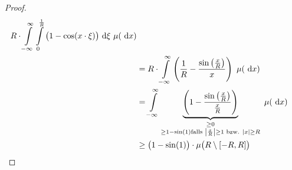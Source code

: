 \begin{proof}
\begin{align*}
		R\cdot\int\limits_{-\infty}^{\infty}\int\limits_0^{\frac{1}{R}}\big(1-\cos(x\cdot\xi)\big)\text{ d}\xi~\mu(\text{ d} x)\\
		&=R\cdot\int\limits_{-\infty}^{\infty}\left(\frac{1}{R}-\frac{\sin\left(\frac{x}{R}\right)}{x}\right)~\mu(\text{ d} x)\\
		&=\int\limits_{-\infty}^{\infty}\underbrace{\left(1-\frac{\sin\left(\frac{x}{R}\right)}{\frac{x}{R}}\right)}_{
		\begin{subarray}{c}		
			\geq0\\
			\geq1-\sin(1)\text{falls }\left|\frac{x}{R}\right|\geq1\text{ bzw. }|x|\geq R
		\end{subarray}}~\mu(\text{ d} x)\\
		&\geq
		\big(1-\sin(1)\big)\cdot\mu\big(R\setminus[-R,R]\big)
	\end{align*}
\end{proof}

